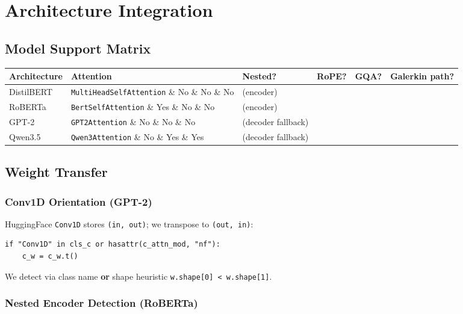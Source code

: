 
\section{Architecture Integration}

\subsection{Model Support Matrix}

\begin{table}[H]
\centering
\small
\begin{tabular}{llllll}
\toprule
\textbf{Architecture} & \textbf{Attention} & \textbf{Nested?} & \textbf{RoPE?} & \textbf{GQA?} & \textbf{Galerkin path?} \\
\midrule
DistilBERT & \texttt{MultiHeadSelfAttention} \& No \& No \& No & (encoder) \\
RoBERTa & \texttt{BertSelfAttention} \& Yes \& No \& No & (encoder) \\
GPT-2 & \texttt{GPT2Attention} \& No \& No \& No & (decoder fallback) \\
Qwen3.5 & \texttt{Qwen3Attention} \& No \& Yes \& Yes & (decoder fallback) \\
\bottomrule
\end{tabular}
\end{table}

\subsection{Weight Transfer}

\subsubsection{Conv1D Orientation (GPT-2)}

HuggingFace \texttt{Conv1D} stores \texttt{(in, out)}; we transpose to \texttt{(out, in)}:

\begin{lstlisting}
if "Conv1D" in cls_c or hasattr(c_attn_mod, "nf"):
    c_w = c_w.t()
\end{lstlisting}

We detect via class name \textbf{or} shape heuristic \texttt{w.shape[0] < w.shape[1]}.

\subsubsection{Nested Encoder Detection (RoBERTa)}

